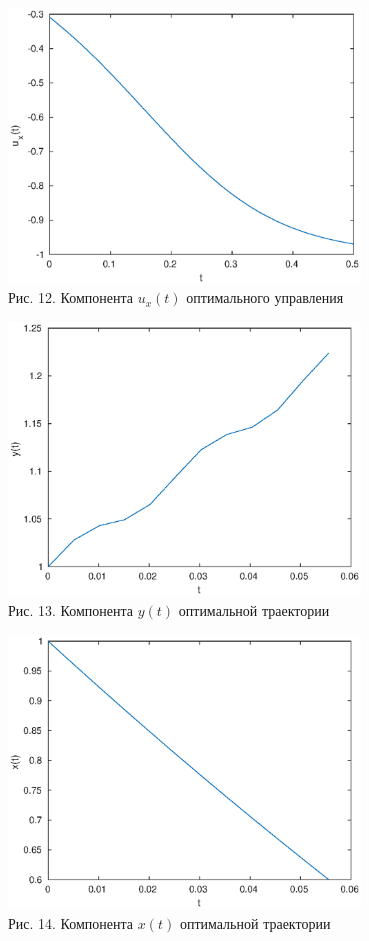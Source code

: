 \documentclass[11pt]{article}
\begin{document}
\begin{center}
	\includegraphics[width=0.7\textwidth]{pic_12.eps}\\
	{Рис. 12. Компонента $u_x(t)$ оптимального управления}
\end{center}

\begin{center}
	\includegraphics[width=0.7\textwidth]{pic_13.eps}\\
	{Рис. 13. Компонента $y(t)$ оптимальной траектории}
\end{center}

\begin{center}
	\includegraphics[width=0.7\textwidth]{pic_14.eps}\\
	{Рис. 14. Компонента $x(t)$ оптимальной траектории}
\end{center}
\end{document}
